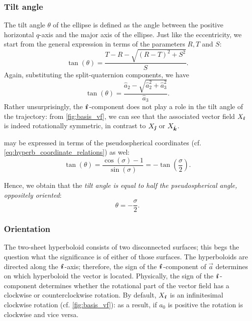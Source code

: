 \subsubsection{Tilt angle} The tilt angle \(\theta\) of the ellipse is defined as the angle between the positive horizontal \(q\)-axis and the major axis of the ellipse. Just like the eccentricity, we start from the general expression in terms of the parameters \(R, T\) and \(S\):
\begin{equation}
    \tan(\theta) = \frac{T - R - \sqrt{(R - T)^2 + S^2}}{S}.
\end{equation}
Again, substituting the split-quaternion components, we have
\begin{equation}
    \tan(\theta) = \frac{\hat{a}_2 - \sqrt{\hat{a}_2^2 + \hat{a}_3^2}}{\hat{a}_3}.
    \label{eq:tilt_angle}
\end{equation}
Rather unsurprisingly, the \(\quati\)-component does not play a role in the tilt angle of the trajectory: from \cref{fig:basis_vf}, we can see that the associated vector field \(X_\quati\) is indeed rotationally symmetric, in contrast to \(X_\quatj\) or \(X_\quatk\).

 may be expressed in terms of the pseudospherical coordinates (cf. \cref{eq:hyperb_coordinate_relations}) as wel:
\begin{equation}
     \tan(\theta) = \frac{\cos(\sigma) - 1}{\sin(\sigma)} = -\tan(\frac{\sigma}{2}).
\end{equation}

Hence, we obtain that the \emph{tilt angle is equal to half the pseudospherical angle, oppositely oriented}:
\begin{equation}
     \theta = -\frac{\sigma}{2}.
\end{equation}

\subsubsection{Orientation} 
The two-sheet hyperboloid consists of two disconnected surfaces; this begs the question what the significance is of either of those surfaces. The hyperboloids are directed along the \(\quati\)-axis; therefore, the sign of the \(\quati\)-component of \(\vec{a}\) determines on which hyperboloid the vector is located. Physically, the sign of the \(\quati\)-component determines whether the rotational part of the vector field has a clockwise or counterclockwise rotation. By default, \(X_\quati\) is an infinitesimal clockwise rotation (cf. \cref{fig:basis_vf}): as a result, if \(a_0\) is positive the rotation is clockwise and vice versa.

